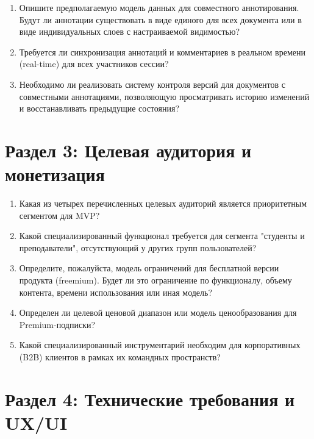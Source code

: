 \documentclass[12pt,a4paper]{article}
\begin{document}
\begin{enumerate}[resume]
    \item Опишите предполагаемую модель данных для совместного аннотирования. Будут ли аннотации существовать в виде единого для всех документа или в виде индивидуальных слоев с настраиваемой видимостью?
    
    \item Требуется ли синхронизация аннотаций и комментариев в реальном времени (real-time) для всех участников сессии?
    
    \item Необходимо ли реализовать систему контроля версий для документов с совместными аннотациями, позволяющую просматривать историю изменений и восстанавливать предыдущие состояния?
\end{enumerate}

\vspace{1cm}

\section*{Раздел 3: Целевая аудитория и монетизация}

\begin{enumerate}[resume]
    \item Какая из четырех перечисленных целевых аудиторий является приоритетным сегментом для MVP?
    
    \item Какой специализированный функционал требуется для сегмента "студенты и преподаватели", отсутствующий у других групп пользователей?
    
    \item Определите, пожалуйста, модель ограничений для бесплатной версии продукта (freemium). Будет ли это ограничение по функционалу, объему контента, времени использования или иная модель?
    
    \item Определен ли целевой ценовой диапазон или модель ценообразования для Premium-подписки?
    
    \item Какой специализированный инструментарий необходим для корпоративных (B2B) клиентов в рамках их командных пространств?
\end{enumerate}

\vspace{1cm}

\section*{Раздел 4: Технические требования и UX/UI}
\end{document}
